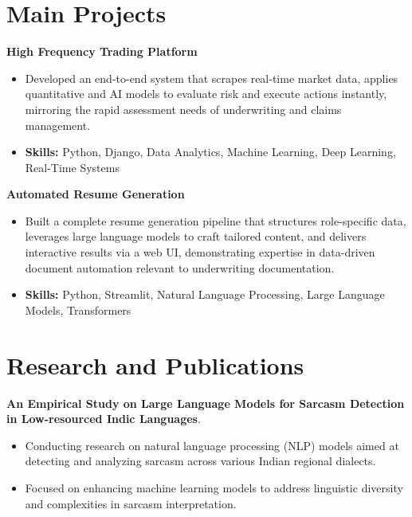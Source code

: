 \documentclass[a4paper,11pt]{article}
\begin{document}
\section{\textbf{Main Projects}}

\vspace{1mm}
  \textbf{High Frequency Trading Platform  }
\vspace{-1.5mm} %
\begin{itemize}
  \item Developed an end-to-end system that scrapes real-time market data, applies quantitative and AI models to evaluate risk and execute actions instantly, mirroring the rapid assessment needs of underwriting and claims management.
\vspace{-3mm}
  \item \textbf{Skills:} Python, Django, Data Analytics, Machine Learning, Deep Learning, Real-Time Systems
\end{itemize}


\vspace{1mm}
   \textbf{Automated Resume Generation }
\vspace{-1.5mm} %
\begin{itemize}
  \item Built a complete resume generation pipeline that structures role-specific data, leverages large language models to craft tailored content, and delivers interactive results via a web UI, demonstrating expertise in data-driven document automation relevant to underwriting documentation.
\vspace{-3mm}
  \item \textbf{Skills:} Python, Streamlit, Natural Language Processing, Large Language Models, Transformers
\end{itemize}



\section{\textbf{Research and Publications} \hfill }
\vspace{1mm}
  \textbf{An Empirical Study on Large Language Models for Sarcasm Detection in Low-resourced Indic Languages}.
\vspace{-1mm} %
\begin{itemize}
  \item Conducting research on natural language processing (NLP) models aimed at detecting and analyzing sarcasm across various Indian regional dialects.
\vspace{-3mm}
  \item Focused on enhancing machine learning models to address linguistic diversity and complexities in sarcasm interpretation.
\end{itemize}
\end{document}
